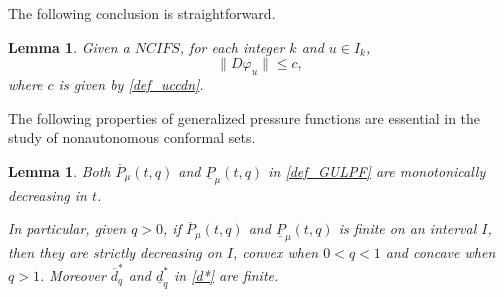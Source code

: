 \documentclass[12pt]{amsart}
\theoremstyle{plain}
\newtheorem{lem}[thm]{Lemma}
\theoremstyle{definition}
\theoremstyle{remark}
\newcommand{\bu}{\mathbf{u}}
\newcommand{\red}[1]{{\color{red}#1}}
\begin{document}

The following conclusion is straightforward. 
\begin{lem}\label{u contraction}
Given a $NCIFS$, for each integer $k$ and $u\in I_k$, 
$$
\|D\varphi_u\|\le c,
$$
where $c$ is given by \eqref{def_uccdn}.
\end{lem}

The following properties of generalized pressure functions are essential in the study of nonautonomous conformal sets.
\begin{lem}\label{m d}
Both  $\overline P_\mu(t, q)$ and  $\underline P_\mu(t, q)$  in \eqref{def_GULPF} are  monotonically  decreasing  in $t$. 

In particular, given $q>0$,   if $\overline P_\mu(t, q)$ and  $\underline P_\mu(t, q)$ is finite on an  interval $I$, then they are strictly decreasing on $I$,  convex  when $0<q<1$ and  concave   when $q>1$. Moreover $\overline{d}_q^*$ and $\underline{d}_q^*$ in \eqref{d*} are finite. 
\end{lem}
\end{document}
